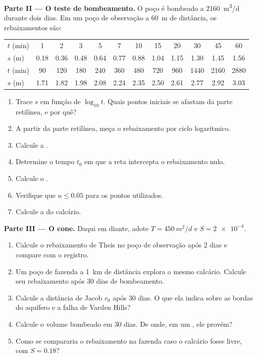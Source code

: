 \begin{problem}
\medskip\noindent\textbf{Parte II --- O teste de bombeamento.} O poço é bombeado
a \qty{2160}{m^3/d} durante dois dias. Em um poço de observação a \qty{60}{m}
de distância, os rebaixamentos são:
\begin{center}
\begin{tabular}{l*{11}{c}}
\hline
$t$ (\unit{min}) & 1 & 2 & 3 & 5 & 7 & 10 & 15 & 20 & 30 & 45 & 60\\
$s$ (\unit{m}) & 0.18 & 0.36 & 0.48 & 0.64 & 0.77 & 0.88 & 1.04 & 1.15 & 1.30 & 1.45 & 1.56\\
\hline
$t$ (\unit{min}) & 90 & 120 & 180 & 240 & 360 & 480 & 720 & 960 & 1440 & 2160 & 2880\\
$s$ (\unit{m}) & 1.71 & 1.82 & 1.98 & 2.08 & 2.24 & 2.35 & 2.50 & 2.61 & 2.77 & 2.92 & 3.03\\
\hline
\end{tabular}
\end{center}
\begin{enumerate}[resume]
\item Trace $s$ em função de $\log_{10}t$. Quais pontos iniciais se afastam
  da parte retilínea, e por quê?
\item A partir da parte retilínea, meça o rebaixamento por ciclo logarítmico.
\item Calcule a .
\item Determine o tempo $t_0$ em que a reta intercepta o rebaixamento nulo.
\item Calcule o .
\item Verifique que $u \le 0.05$ para os pontos utilizados.
\item Calcule a  do calcário.
\end{enumerate}

\medskip\noindent\textbf{Parte III --- O cone.} Daqui em diante, adote $T =
\qty{450}{m^2/d}$ e $S = \num{2e-4}$.
\begin{enumerate}[resume]
\item Calcule o rebaixamento de Theis no poço de observação após 2 dias e
  compare com o registro.
\item Um poço de fazenda a \qty{1}{km} de distância explora o mesmo calcário. Calcule seu
  rebaixamento após 30 dias de bombeamento.
\item Calcule a distância de Jacob $r_0$ após 30 dias. O que ela indica sobre
  as bordas do aquífero e a falha de Varden Hills?
\item Calcule o volume bombeado em 30 dias. De onde, em um ,
  ele provém?
\item Como se compararia o rebaixamento na fazenda caso o calcário fosse
  livre, com $S = 0.18$?
\end{enumerate}


\end{problem}
